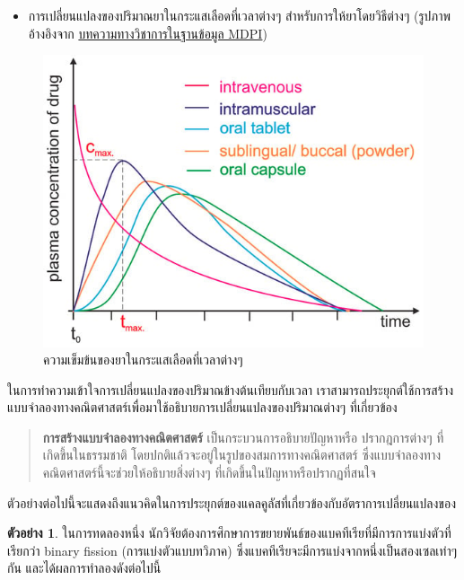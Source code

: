\documentclass[
]{book}
\providecommand{\tightlist}{%
  \setlength{\itemsep}{0pt}\setlength{\parskip}{0pt}}
\theoremstyle{definition}
\theoremstyle{definition}
\newtheorem{example}{ตัวอย่าง}[chapter]
\theoremstyle{definition}
\theoremstyle{definition}
\theoremstyle{remark}
\begin{document}
\begin{itemize}
\tightlist
\item
  การเปลี่ยนแปลงของปริมาณยาในกระแสเลือดที่เวลาต่างๆ สำหรับการให้ยาโดยวิธีต่างๆ (รูปภาพอ้างอิงจาก \href{https://www.mdpi.com/1420-3049/28/24/8038}{บทความทางวิชาการในฐานข้อมูล MDPI})
\end{itemize}

\begin{figure}
\includegraphics[width=1\linewidth]{images/fig-drug-absorption} \caption{ความเข็มข้นของยาในกระแสเลือดที่เวลาต่างๆ }\label{fig:fig-drug-absorption}
\end{figure}

ในการทำความเข้าใจการเปลี่ยนแปลงของปริมาณข้างต้นเทียบกับเวลา เราสามารถประยุกต์ใช้การสร้างแบบจำลองทางคณิตศาสตร์เพื่อมาใช้อธิบายการเปลี่ยนแปลงของปริมาณต่างๆ ที่เกี่ยวข้อง

\begin{quote}
\textbf{การสร้างแบบจำลองทางคณิตศาสตร์} เป็นกระบวนการอธิบายปัญหาหรือ ปรากฎการต่างๆ ที่เกิดขึ้นในธรรมชาติ โดยปกติแล้วจะอยู่ในรูปของสมการทางคณิตศาสตร์ ซึ่งแบบจำลองทางคณิตศาสตร์นี้จะช่วยให้อธิบายสิ่งต่างๆ ที่เกิดขึ้นในปัญหาหรือปรากฏที่สนใจ
\end{quote}

ตัวอย่างต่อไปนี้จะแสดงถึงแนวคิดในการประยุกต์ของแคลคูลัสที่เกี่ยวข้องกับอัตราการเปลี่ยนแปลงของ

\begin{example}
\protect\hypertarget{exm:exm1}{}\label{exm:exm1}ในการทดลองหนึ่ง นักวิจัยต้องการศึกษาการขยายพันธ์ของแบคทีเรียที่มีการการแบ่งตัวที่เรียกว่า binary fission (การแบ่งตัวแบบทวิภาค) ซึ่งแบคทีเรียจะมีการแบ่งจากหนึ่งเป็นสองเซลเท่าๆ กัน และได้ผลการทำลองดังต่อไปนี้
\end{example}
\end{document}
